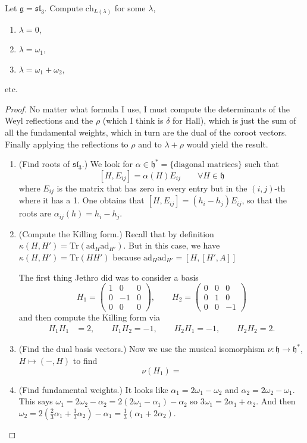 \begin{exercise}
\label{exercise-Weyl-character-formula-in-sl3}
Let $\mathfrak{g}=\mathfrak{sl}_3$. Compute $\text{ch}_{L(\lambda)}$
for some $\lambda$,
\begin{enumerate}
\item $\lambda=0$,
\item $\lambda=\omega_1$,
\item $\lambda=\omega_1+\omega_2$,
\end{enumerate}
etc.
\end{exercise}

\begin{proof}
No matter what formula I use, I must compute
the determinants of the Weyl reflections
and the $\rho$ (which I think is $\delta$ for Hall),
which is just the sum of all the fundamental weights,
which in turn are the dual of the coroot vectors.
Finally applying the reflections to $\rho$ and
to $\lambda+\rho$ would yield the result.
\begin{enumerate}
\item (Find roots of $\mathfrak{sl}_3$.) We look for $\alpha \in \mathfrak{h}^*
= \{\text{diagonal matrices}\}$ such that
$$
[H,E_{ij}]=\alpha(H)E_{ij}\qquad \forall H \in \mathfrak{h}
$$
where $E_{ij}$ is the matrix that has zero in every entry but 
in the $(i,j)$-th where it has a 1. One obtains that
$[H,E_{ij}]=(h_i-h_j)E_{ij}$, so that the roots are
$\alpha_{ij}(h)=h_i-h_j$. 

\item (Compute the Killing form.) Recall that by definition
$\kappa(H,H')=\text{Tr}(\text{ad}_H\text{ad}_{H'})$.
But in this case, we have $\kappa(H,H')=\text{Tr}(HH')$ 
because $\text{ad}_H\text{ad}_{H'}=[H,[H',A]]$

The first thing Jethro did was to consider a basis
$$
H_1=\begin{pmatrix}
1&0&0\\ 
0&-1&0\\
0&0&0
\end{pmatrix},
\qquad
H_2=\begin{pmatrix}
0&0&0\\ 
0&1&0\\
0&0&-1
\end{pmatrix}
$$
and then compute the Killing form via
\begin{align*}
H_1H_1&=2,\qquad H_1H_2=-1,\qquad H_2H_1=-1,\qquad H_2H_2=2.
\end{align*}

\item (Find the dual basis vectors.) Now we use the musical
isomorphism $\nu:\mathfrak{h}\to \mathfrak{h}^*$, 
$H\mapsto (-,H)$ to find
$$
\nu(H_1)=
$$
\item (Find fundamental weights.) It looks like $\alpha_1=2 \omega_1-\omega_2$
and $\alpha_2=2\omega_2-\omega_1$. This says 
$\omega_1=2\omega_2-\alpha_2=2(2\omega_1-\alpha_1)-\alpha_2$ so
$3\omega_1=2\alpha_1+\alpha_2$. And then 
$\omega_2=2(\frac{2}{3}\alpha_1+\frac{1}{3}\alpha_2)-\alpha_1
=\frac{1}{3}(\alpha_1+2\alpha_2)$.


\end{enumerate}
\end{proof}
